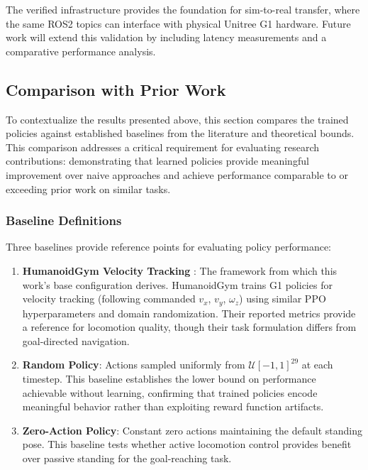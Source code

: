 \documentclass[12pt,a4paper]{article}
\begin{document}
The verified infrastructure provides the foundation for sim-to-real transfer, where the same ROS2 topics can interface with physical Unitree G1 hardware. Future work will extend this validation by including latency measurements and a comparative performance analysis.

\subsection{Comparison with Prior Work}

To contextualize the results presented above, this section compares the trained policies against established baselines from the literature and theoretical bounds. This comparison addresses a critical requirement for evaluating research contributions: demonstrating that learned policies provide meaningful improvement over naive approaches and achieve performance comparable to or exceeding prior work on similar tasks.

\subsubsection{Baseline Definitions}

Three baselines provide reference points for evaluating policy performance:

\begin{enumerate}
    \item \textbf{HumanoidGym Velocity Tracking} \parencite{gu2024humanoidgym}: The framework from which this work's base configuration derives. HumanoidGym trains G1 policies for velocity tracking (following commanded $v_x$, $v_y$, $\omega_z$) using similar PPO hyperparameters and domain randomization. Their reported metrics provide a reference for locomotion quality, though their task formulation differs from goal-directed navigation.

    \item \textbf{Random Policy}: Actions sampled uniformly from $\mathcal{U}[-1, 1]^{29}$ at each timestep. This baseline establishes the lower bound on performance achievable without learning, confirming that trained policies encode meaningful behavior rather than exploiting reward function artifacts.

    \item \textbf{Zero-Action Policy}: Constant zero actions maintaining the default standing pose. This baseline tests whether active locomotion control provides benefit over passive standing for the goal-reaching task.
\end{enumerate}
\end{document}
